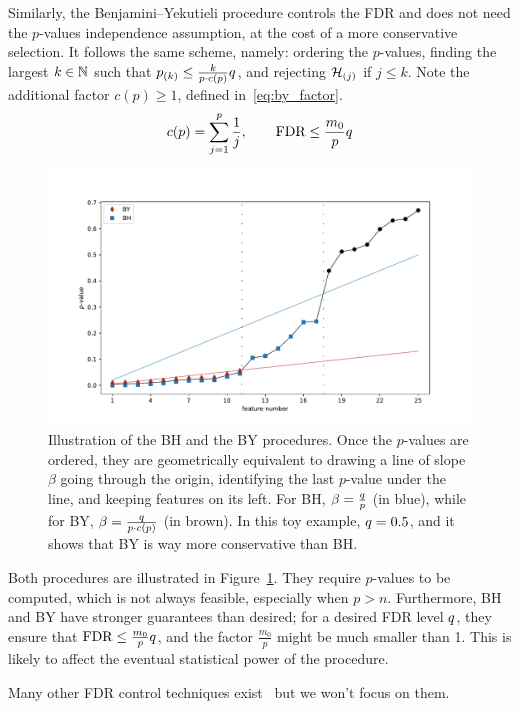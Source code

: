 Similarly, the Benjamini–Yekutieli procedure controls the FDR
and does not need the $p$-values independence assumption,
at the cost of a more conservative selection.
It follows the same scheme, namely:
ordering the $p$-values,
finding the largest $k \in \mathbb{N}$ such that $p_{(k)} \leq \frac{k}{p \cdot c(p)}q$,
and rejecting $\mathcal{H}_{(j)}$ if $j \leq k$.
Note the additional factor $c(p) \geq 1$, defined in~\ref{eq:by_factor}.
\begin{equation}\label{eq:by_factor}
c(p) = \sum_{j = 1}^p \frac{1}{j}
,\qquad
\text{FDR} \leq \frac{m_0}{p}q
\end{equation}
\begin{figure}[h]
    \centering
    \includegraphics[width=1.\textwidth]{figures/bhy.pdf}
    \caption{
        Illustration of the BH and the BY procedures.
        Once the $p$-values are ordered,
        they are geometrically equivalent to drawing a line of slope $\beta$ going through the origin,
        identifying the last $p$-value under the line, and keeping features on its left.
        For BH, $\beta = \frac{q}{p}$ (in blue),
        while for BY, $\beta = \frac{q}{p \cdot c(p)}$ (in brown).
        In this toy example, $q = 0.5$, and it shows that BY is way more conservative than BH.
    }
    \label{fig:bhy}
\end{figure}
\bigbreak
Both procedures are illustrated in Figure~\ref{fig:bhy}.
They require $p$-values to be computed, which is not always feasible, especially when $p > n$.
Furthermore, BH and BY have stronger guarantees than desired;
for a desired FDR level $q$,
they ensure that $\text{FDR} \leq \frac{m_0}{p}q$,
and the factor $\frac{m_0}{p}$ might be much smaller than 1.
This is likely to affect the eventual statistical power of the procedure.

Many other FDR control techniques exist~\citep{resampled_fdr_control, unified_fdr_control}
but we won't focus on them.
